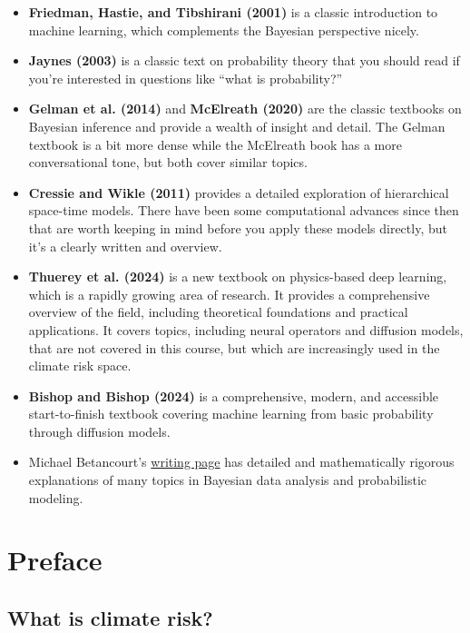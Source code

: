 \documentclass[
  letterpaper,
  DIV=11,
  numbers=noendperiod]{scrreprt}
\providecommand{\tightlist}{%
  \setlength{\itemsep}{0pt}\setlength{\parskip}{0pt}}
\begin{document}
\begin{itemize}
\tightlist
\item
  \textbf{Friedman, Hastie, and Tibshirani (2001)} is a classic
  introduction to machine learning, which complements the Bayesian
  perspective nicely.
\item
  \textbf{Jaynes (2003)} is a classic text on probability theory that
  you should read if you're interested in questions like ``what is
  probability?''
\item
  \textbf{Gelman et al. (2014)} and \textbf{McElreath (2020)} are the
  classic textbooks on Bayesian inference and provide a wealth of
  insight and detail. The Gelman textbook is a bit more dense while the
  McElreath book has a more conversational tone, but both cover similar
  topics.
\item
  \textbf{Cressie and Wikle (2011)} provides a detailed exploration of
  hierarchical space-time models. There have been some computational
  advances since then that are worth keeping in mind before you apply
  these models directly, but it's a clearly written and overview.
\item
  \textbf{Thuerey et al. (2024)} is a new textbook on physics-based deep
  learning, which is a rapidly growing area of research. It provides a
  comprehensive overview of the field, including theoretical foundations
  and practical applications. It covers topics, including neural
  operators and diffusion models, that are not covered in this course,
  but which are increasingly used in the climate risk space.
\item
  \textbf{Bishop and Bishop (2024)} is a comprehensive, modern, and
  accessible start-to-finish textbook covering machine learning from
  basic probability through diffusion models.
\item
  Michael Betancourt's
  \href{https://betanalpha.github.io/writing/}{writing page} has
  detailed and mathematically rigorous explanations of many topics in
  Bayesian data analysis and probabilistic modeling.
\end{itemize}


\chapter*{Preface}\label{preface}


\section*{What is climate risk?}\label{what-is-climate-risk}
\end{document}
